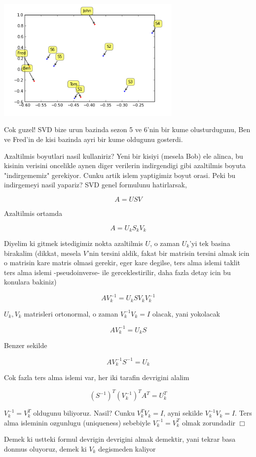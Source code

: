 \documentclass[12pt,fleqn]{article}\usepackage{../common}
\begin{document}
\includegraphics[height=6cm]{svdrecom_1.png}

Cok guzel! SVD bize urun bazinda sezon 5 ve 6'nin bir kume
olusturdugunu, Ben ve Fred'in de kisi bazinda ayri bir kume oldugunu
gosterdi.

Azaltilmis boyutlari nasil kullaniriz? Yeni bir kisiyi (mesela Bob)
ele alinca, bu kisinin verisini oncelikle aynen diger verilerin
indirgendigi gibi azaltilmis boyuta "indirgememiz" gerekiyor. Cunku
artik islem yaptigimiz boyut orasi. Peki bu indirgemeyi nasil yapariz?
SVD genel formulunu hatirlarsak,

$$ A = USV $$

Azaltilmis ortamda

$$ A = U_k S_k V_k $$

Diyelim ki gitmek istedigimiz nokta azaltilmis $U$, o zaman $U_k$'yi tek
basina birakalim (dikkat, mesela $V$'nin tersini aldik, fakat bir matrisin
tersini almak icin o matrisin kare matris olmasi gerekir, eger kare
degilse, ters alma islemi taklit ters alma islemi -pseudoinverse- ile
gerceklestirilir, daha fazla detay icin bu konulara bakiniz)

$$ A V_k^{-1} = U_k S V_k V_k^{-1} $$

$U_k,V_k$ matrisleri ortonormal, o zaman $V_k^{-1}V_k = I$ olacak,
yani yokolacak

$$ A V_k^{-1} = U_k S  $$

Benzer sekilde

$$  A V_k^{-1} S^{-1} = U_k $$

Cok fazla ters alma islemi var, her iki tarafin devrigini alalim

$$ (S^{-1})^T (V_k^{-1})^T A^T = U_k^T $$

$V_k^{-1} = V_k^T$ oldugunu biliyoruz. Nasil? Cunku $ V_k^TV_k = I $, ayni
sekilde $ V_k^{-1}V_k = I $. Ters alma isleminin ozgunlugu (uniqueness)
sebebiyle $V_k^{-1} = V_k^T$ olmak zorundadir $\Box$

Demek ki ustteki formul devrigin devrigini almak demektir, yani tekrar basa
donmus oluyoruz, demek ki $V_k$ degismeden kaliyor
\end{document}
